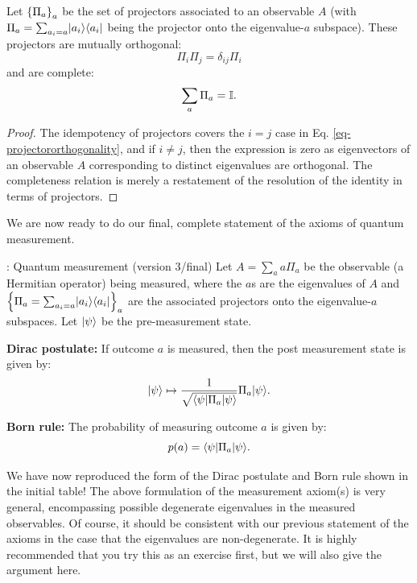 \begin{propbox}{}
    Let $\set{\Pi_a}_a$ be the set of projectors associated to an observable $A$ (with $\Pi_a = \sum_{a_i = a}\lvert a_i \rangle \langle a_i \rvert$ being the projector onto the eigenvalue-$a$ subspace). These projectors are mutually orthogonal:
    \begin{equation}\label{eq-projectororthogonality}
        \Pi_i\Pi_j = \delta_{ij}\Pi_i
    \end{equation}
    and are complete:
    \begin{equation}
        \sum_a \Pi_a = \mathbb{I}.
    \end{equation}
\end{propbox}
\begin{proof}
    The idempotency of projectors covers the $i = j$ case in Eq. \eqref{eq-projectororthogonality}, and if $i \neq j$, then the expression is zero as eigenvectors of an observable $A$ corresponding to distinct eigenvalues are orthogonal. The completeness relation is merely a restatement of the resolution of the identity in terms of projectors.
\end{proof}

We are now ready to do our final, complete statement of the axioms of quantum measurement.

\begin{axiombox}{: Quantum measurement (version 3/final)}
    Let $A =  \sum_a a\Pi_a$ be the observable (a Hermitian operator) being measured,  where the $a$s are the eigenvalues of $A$ and $\set{\Pi_a = \sum_{a_i = a}\lvert a_i \rangle \langle a_i \rvert}_a$ are the associated projectors onto the eigenvalue-$a$ subspaces. Let $\lvert \psi \rangle$ be the pre-measurement state.

    \textbf{Dirac postulate:} If outcome $a$ is measured, then the post measurement state is given by:
    \begin{equation}\label{eq-diracpostulate}
        \lvert \psi \rangle \mapsto \frac{1}{\sqrt{\langle \psi \rvert\Pi_a\lvert \psi \rangle}}\Pi_a\lvert \psi \rangle.
    \end{equation}

    \textbf{Born rule:} The probability of measuring outcome $a$ is given by:
    \begin{equation}\label{eq-bornrule}
        p(a) = \langle \psi \rvert\Pi_a\lvert \psi \rangle.
    \end{equation}
\end{axiombox}
We have now reproduced the form of the Dirac postulate and Born rule shown in the initial table! The above formulation of the measurement axiom(s) is very general, encompassing possible degenerate eigenvalues in the measured observables. Of course, it should be consistent with our previous statement of the axioms in the case that the eigenvalues are non-degenerate. It is highly recommended that you try this as an exercise first, but we will also give the argument here.

